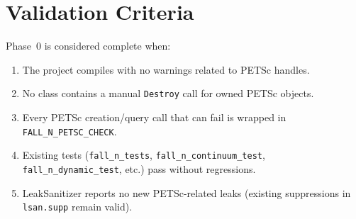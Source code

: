 
\section{Validation Criteria}

Phase~0 is considered complete when:

\begin{enumerate}
  \item The project compiles with no warnings related to PETSc handles.
  \item No class contains a manual \texttt{Destroy} call for owned
        PETSc objects.
  \item Every PETSc creation/query call that can fail is wrapped in
        \texttt{FALL\_N\_PETSC\_CHECK}.
  \item Existing tests (\texttt{fall\_n\_tests},
        \texttt{fall\_n\_continuum\_test}, \texttt{fall\_n\_dynamic\_test},
        etc.) pass without regressions.
  \item LeakSanitizer reports no new PETSc-related leaks
        (existing suppressions in \texttt{lsan.supp} remain valid).
\end{enumerate}

